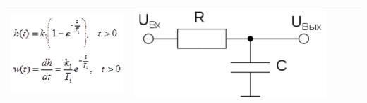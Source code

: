 \documentclass[14pt,a4paper,report]{report}
\begin{document}
\begin{table}[h!]
\begin{tabular}{ | m{3cm} | m{3.5cm} | m{4.5cm} | m{2.5cm} | m{2.5cm} }
\begin{minipage}{.3\textwidth}
			\includegraphics[scale = 0.35]{images/4_4.png}
		\end{minipage}
		&
		\begin{minipage}{.3\textwidth}
			\includegraphics[scale = 0.2]{images/4_5.png}
		\end{minipage} \\ \hline	
		

\end{tabular}
\end{table}
\end{document}
